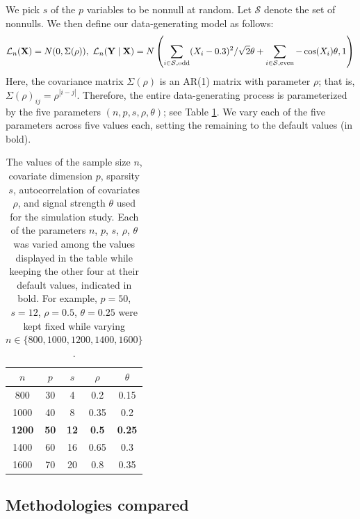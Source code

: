 \documentclass[12pt]{article}
\theoremstyle{definition}
\theoremstyle{remark}
\newcommand{\law}{\mathcal L}							%
\begin{document}
	We pick $s$ of the $p$ variables to be nonnull at random. Let $\mathcal{S}$ denote the set of nonnulls. We then define our data-generating model as follows:
	\begin{equation*}
	\law_n(\mathbf{X}) = N(0,\Sigma(\rho)), \ \law_n(\mathbf{Y} \mid \mathbf{X}) = N\left(\sum_{i \in \mathcal{S}, \textnormal{odd}} (X_i - 0.3)^2 / \sqrt{2} \theta + \sum_{i \in \mathcal{S}, \textnormal{even}} - \cos(X_i)\theta,1 \right)
	\end{equation*}
	Here, the covariance matrix $\Sigma(\rho)$ is an AR(1) matrix with parameter $\rho$; that is, $\Sigma(\rho)_{ij} = \rho^{|i-j|}$. Therefore, the entire data-generating process is parameterized by the five parameters $(n, p, s, \rho, \theta)$; see Table \ref{tab:gam sim parameters}. We vary each of the five parameters across five values each, setting the remaining to the default values (in bold).

	\begin{table}[h!]
		\centering
		\begin{tabular}{ccccc}
			\hline
			$n$ & $p$ & $s$ & $\rho$ & $\theta$ \\
			\hline
			800 & 30 & 4 & 0.2 & 0.15 \\
			1000 & 40 & 8 & 0.35 & 0.2 \\
			\textbf{1200} & \textbf{50} & \textbf{12} & \textbf{0.5} & \textbf{0.25} \\
			1400 & 60 & 16 & 0.65 & 0.3 \\
			1600 & 70 & 20 & 0.8 & 0.35 \\
			\hline
		\end{tabular}
		\caption{The values of the sample size $n$, covariate dimension $p$, sparsity $s$, autocorrelation of covariates $\rho$, and signal strength $\theta$ used for the
		simulation study. Each of the parameters $n$, $p$, $s$, $\rho$, $\theta$ was varied among the values displayed in the
		table while keeping the other four at their default values, indicated in bold. For example, $p = 50$, $s = 12$, $\rho = 0.5$, $\theta = 0.25$ were kept fixed while varying $n \in \{800, 1000, 1200, 1400, 1600\}$.}
		\label{tab:gam sim parameters}
	\end{table}

	\subsection{Methodologies compared}
\end{document}
